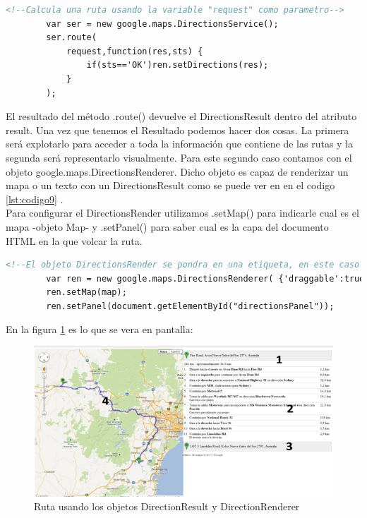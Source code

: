     \begin{lstlisting}[language=HTML, caption=Cálculo de la ruta, label=lst:codigo8]
        <!--Calcula una ruta usando la variable "request" como parametro-->
        var ser = new google.maps.DirectionsService();
        ser.route(
        	request,function(res,sts) {
        		if(sts=='OK')ren.setDirections(res);	
        	}
        );	
    \end{lstlisting}

\hspace*{1cm}El resultado del método .route() devuelve el DirectionsResult dentro del atributo result.
Una vez que tenemos el Resultado podemos hacer dos cosas. La primera será explotarlo para acceder a toda la información que contiene de las rutas y la segunda será representarlo visualmente. Para este segundo caso contamos con el objeto google.maps.DirectionsRenderer. Dicho objeto es capaz de renderizar un mapa o un texto con un DirectionsResult como se puede ver en en el codigo \ref{lst:codigo9} .\\
Para configurar el DirectionsRender utilizamos .setMap() para indicarle cual es el mapa -objeto Map- y .setPanel() para saber cual es la capa del documento HTML en la que volcar la ruta.\\

    \begin{lstlisting}[language=HTML, caption=Etiqueta que graficará el camino, label=lst:codigo9]
        <!--El objeto DirectionsRender se pondra en una etiqueta, en este caso "directionsPanel"-->
        var ren = new google.maps.DirectionsRenderer( {'draggable':true} );
        ren.setMap(map);
        ren.setPanel(document.getElementById("directionsPanel"));
    \end{lstlisting}
      
En la figura \ref {fig:Cap2_3_8} es lo que se vera en pantalla:

    \begin{figure}[hbtp]
        \centering
            \includegraphics{Imagenes/Cap2_3_8.png}
            \caption{Ruta usando los objetos DirectionResult y DirectionRenderer}                       \label{fig:Cap2_3_8}
    \end{figure}   

